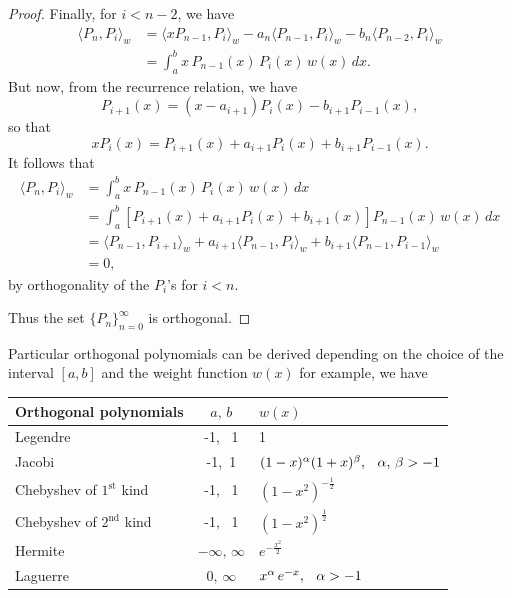 \documentclass[12pt,a4paper]{report}
\theoremstyle{definition}
\theoremstyle{plain}
\begin{document}
\begin{proof}
Finally, for $i < n-2$, we have
\begin{align*}
\langle P_n, P_i\rangle_w & = \langle x P_{n-1}, P_i\rangle_w - a_n\langle P_{n-1},P_i\rangle_w - b_n\langle P_{n-2},P_i\rangle_w\\
& = \int_a^b x\, P_{n-1}(x)\, P_i(x)\, w(x)\, dx.
\end{align*}
But now, from the recurrence relation, we have $$P_{i+1}(x) = (x - a_{i+1})P_i(x) - b_{i + 1}P_{i-1}(x),$$ so that 
$$x P_i(x) = P_{i + 1}(x) + a_{i + 1} P_i(x) + b_{i + 1} P_{i-1}(x).$$
It follows that
\begin{align*}
\langle P_n, P_i\rangle_w & = \int_a^bx\, P_{n-1}(x)\, P_i(x)\, w(x)\, dx\\
                          & = \int_a^b\left[P_{i+1}(x) + a_{i + 1}P_i(x) + b_{i+1}(x)\right]P_{n-1}(x)\, w(x)\, dx\\
                          & = \langle P_{n-1},P_{i+1}\rangle_w + a_{i+1} \langle P_{n-1},P_i\rangle_w + b_{i+1}\langle P_{n-1}, P_{i-1}\rangle_w\\
                          & = 0,
\end{align*}
by orthogonality of the $P_i$'s for $i < n$.

Thus the set $\{P_n\}^{\infty}_{n=0}$ is orthogonal.
\end{proof}


Particular orthogonal polynomials can be derived depending on the choice of the interval $[a,b]$ and the weight function $w(x)$ for example, we have 
\begin{table}[H]
\centering
\begin{tabular}{|l|c|l|}
\hline
Orthogonal polynomials & $a,\,b$ & $w(x)$\\
\hline
Legendre & -1, \, 1 & 1\\ 
Jacobi & -1,\, 1 & $(1 - x)^{\alpha}(1 + x)^{\beta}, \, \hspace{0.2cm} \alpha,\, \beta >-1$\\
Chebyshev of $1^{\text{st}}$ kind & -1, \, 1 & $(1 - x^2)^{-\frac{1}{2}}$\\
Chebyshev of $2^{\text{nd}}$ kind & -1, \, 1 & $(1 - x^2)^{\frac{1}{2}}$\\
Hermite & $-\infty, \, \infty$  & $e^{-\frac{x^2}{2}}$\\
Laguerre & $0,\, \infty$ & $x^{\alpha}\, e^{-x}, \,\hspace{0.2cm} \alpha > -1$\\
\hline
\end{tabular}
\end{table}
\end{document}
